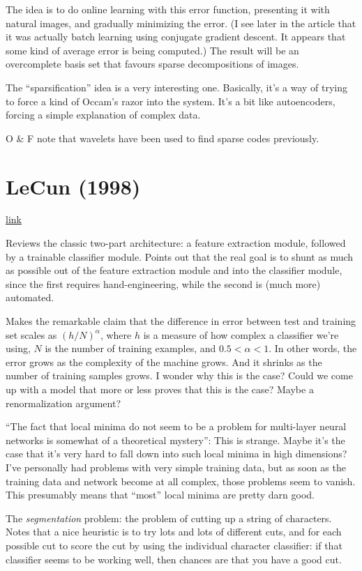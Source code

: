 \documentclass[12pt]{report}
\newcommand{\link}[2]{\href{#1}{#2}}
\begin{document}
The idea is to do online learning with this error function, presenting
it with natural images, and gradually minimizing the error.  (I see
later in the article that it was actually batch learning using
conjugate gradient descent.  It appears that some kind of average
error is being computed.)  The result will be an overcomplete basis
set that favours sparse decompositions of images.

The ``sparsification'' idea is a very interesting one.  Basically,
it's a way of trying to force a kind of Occam's razor into the system.
It's a bit like autoencoders, forcing a simple explanation of complex
data.

O \& F note that wavelets have been used to find sparse codes
previously.


\section{LeCun (1998)}

\link{http://yann.lecun.com/exdb/publis/index.html\#lecun-98}{link}

Reviews the classic two-part architecture: a feature extraction
module, followed by a trainable classifier module.  Points out that
the real goal is to shunt as much as possible out of the feature
extraction module and into the classifier module, since the first
requires hand-engineering, while the second is (much more) automated.

Makes the remarkable claim that the difference in error between test
and training set scales as $(h/N)^\alpha$, where $h$ is a measure of
how complex a classifier we're using, $N$ is the number of training
examples, and $0.5 < \alpha < 1$.  In other words, the error grows as
the complexity of the machine grows.  And it shrinks as the number of
training samples grows.  I wonder why this is the case?  Could we come
up with a model that more or less proves that this is the case?  Maybe
a renormalization argument?

``The fact that local minima do not seem to be a problem for
multi-layer neural networks is somewhat of a theoretical mystery'':
This is strange.  Maybe it's the case that it's very hard to fall down
into such local minima in high dimensions? I've personally had
problems with very simple training data, but as soon as the training
data and network become at all complex, those problems seem to vanish.
This presumably means that ``most'' local minima are pretty darn good.

The \emph{segmentation} problem: the problem of cutting up a string of
characters.  Notes that a nice heuristic is to try lots and lots of
different cuts, and for each possible cut to score the cut by using
the individual character classifier: if that classifier seems to be
working well, then chances are that you have a good cut.
\end{document}
